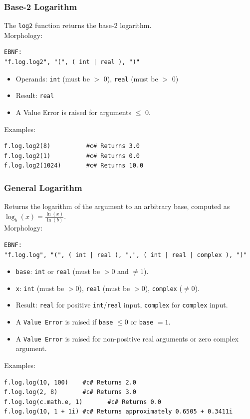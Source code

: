 \subsubsection{Base-2 Logarithm}
The \texttt{log2} function returns the base-2 logarithm.\\
Morphology:
\begin{verbatim}
EBNF:
"f.log.log2", "(", ( int | real ), ")"
\end{verbatim}
\begin{itemize}
\item Operands: \texttt{int} (must be $>$ 0), \texttt{real} (must be $>$ 0)
\item Result: \texttt{real}
\item A Value Error is raised for arguments $\leq$ 0.
\end{itemize}
Examples:
\begin{verbatim}
f.log.log2(8)          #c# Returns 3.0
f.log.log2(1)          #c# Returns 0.0
f.log.log2(1024)       #c# Returns 10.0
\end{verbatim}

\subsubsection{General Logarithm}
Returns the logarithm of the argument to an arbitrary base, computed as $\log_b(x) = \frac{\ln(x)}{\ln(b)}$. \\
Morphology:
\begin{verbatim}
EBNF:
"f.log.log", "(", ( int | real ), ",", ( int | real | complex ), ")"
\end{verbatim}
\begin{itemize}
\item \texttt{base}: \texttt{int} or \texttt{real} (must be $> 0$ and $\neq 1$).
\item \texttt{x}: \texttt{int} (must be $> 0$), \texttt{real} (must be $> 0$), \texttt{complex} ($\neq 0$).
\item Result: \texttt{real} for positive \texttt{int}/\texttt{real} input, \texttt{complex} for \texttt{complex} input.
\item A \texttt{Value Error} is raised if \texttt{base} $\leq 0$ or \texttt{base} $= 1$.
\item A \texttt{Value Error} is raised for non-positive real arguments or zero complex argument.
\end{itemize}
Examples:
\begin{verbatim}
f.log.log(10, 100)    #c# Returns 2.0
f.log.log(2, 8)       #c# Returns 3.0
f.log.log(c.math.e, 1)       #c# Returns 0.0
f.log.log(10, 1 + 1i) #c# Returns approximately 0.6505 + 0.3411i
\end{verbatim}

